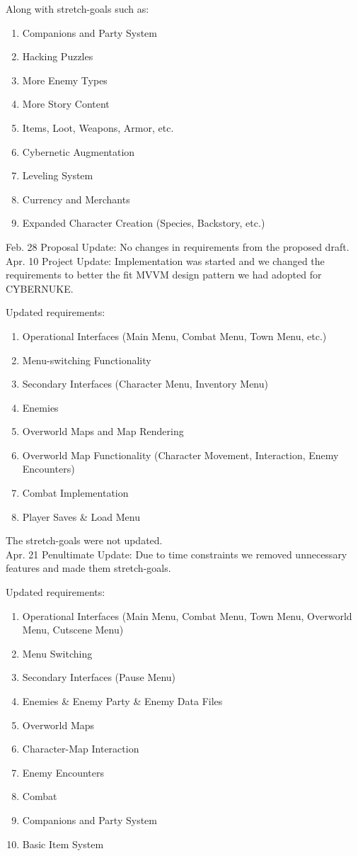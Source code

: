 \documentclass[10pt,conference,onecolumn,compsoc]{IEEEtran}
\begin{document}
Along with stretch-goals such as:
\begin{enumerate}
\item Companions and Party System
\item Hacking Puzzles
\item More Enemy Types
\item More Story Content
\item Items, Loot, Weapons, Armor, etc.
\item Cybernetic Augmentation
\item Leveling System
\item Currency and Merchants
\item Expanded Character Creation (Species, Backstory, etc.)\\
\end{enumerate}

Feb. 28 Proposal Update: 
No changes in requirements from the proposed draft.\\

Apr. 10 Project Update: 
Implementation was started and we changed the requirements to better the fit MVVM design pattern we had adopted for CYBERNUKE.

Updated requirements:
\begin{enumerate}
\item Operational Interfaces (Main Menu, Combat Menu, Town Menu, etc.)
\item Menu-switching Functionality
\item Secondary Interfaces (Character Menu, Inventory Menu)
\item Enemies
\item Overworld Maps and Map Rendering
\item Overworld Map Functionality (Character Movement, Interaction, Enemy Encounters)
\item Combat Implementation
\item Player Saves \& Load Menu
\end{enumerate}

The stretch-goals were not updated.\\

Apr. 21 Penultimate Update: 
Due to time constraints we removed unnecessary features and made them stretch-goals.

Updated requirements:
\begin{enumerate}
\item Operational Interfaces (Main Menu, Combat Menu, Town Menu, Overworld Menu, Cutscene Menu)
\item Menu Switching
\item Secondary Interfaces (Pause Menu)
\item Enemies \& Enemy Party \& Enemy Data Files
\item Overworld Maps
\item Character-Map Interaction
\item Enemy Encounters
\item Combat
\item Companions and Party System
\item Basic Item System
\end{enumerate}
\end{document}
